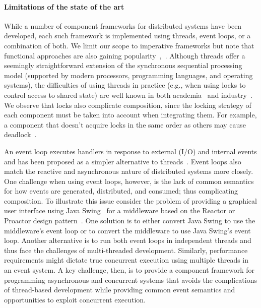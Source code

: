 \paragraph*{Limitations of the state of the art}
While a number of component frameworks for distributed systems have been developed, each such framework is implemented using threads, event loops, or a combination of both.
We limit our scope to imperative frameworks but note that functional approaches are also gaining popularity~\cite{armstrong1996concurrent},~\cite{halloway2009programming}.
Although threads offer a seemingly straightforward extension of the synchronous sequential processing model (supported by modern processors, programming languages, and operating systems),
the difficulties of using threads in practice (e.g., when using locks to control access to shared state) are well known in both academia~\cite{lee2006problem} and industry~\cite{sutter2005free}.
We observe that locks also complicate composition, since the locking strategy of each component must be taken into account when integrating them.
For example, a component that doesn't acquire locks in the same order as others may cause deadlock~\cite{havender1968avoiding}.

An event loop executes handlers in response to external (I/O) and internal events and has been proposed as a simpler alternative to threads~\cite{ousterhout1996threads}.
Event loops also match the reactive and asynchronous nature of distributed systems more closely.
One challenge when using event loops, however, is the lack of common semantics for how events are generated, distributed, and consumed; thus complicating composition.
To illustrate this issue consider the problem of providing a graphical user interface using Java Swing~\cite{eckstein1998java} for a middleware based on the Reactor or Proactor design pattern~\cite{schmidt2000pattern}.
One solution is to either convert Java Swing to use the middleware's event loop or to convert the middleware to use Java Swing's event loop.
Another alternative is to run both event loops in independent threads and thus face the challenges of multi-threaded development.
Similarly, performance requirements might dictate true concurrent execution using multiple threads in an event system.
A key challenge, then, is to provide a component framework for programming asynchronous and concurrent systems that avoids the complications of thread-based development while providing common event semantics and opportunities to exploit concurrent execution.

